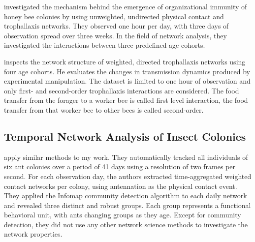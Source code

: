 
\textcite{scholl2011olfactory} investigated the mechanism behind the emergence of organizational immunity of honey bee colonies by using unweighted, undirected physical contact and trophallaxis networks.
They observed one hour per day, with three days of observation spread over three weeks.
In the field of network analysis, they investigated the interactions between three predefined age cohorts.


\textcite{naug2008structure} inspects the network structure of weighted, directed trophallaxis networks using four age cohorts.
He evaluates the changes in transmission dynamics produced by experimental manipulation.
The dataset is limited to one hour of observation and only first- and second-order trophallaxis interactions are considered. The food transfer from the forager to a worker bee is called first level interaction, the food transfer from that worker bee to other bees is called second-order.

\subsection{Temporal Network Analysis of Insect Colonies}

\textcite{mersch2013tracking} apply similar methods to my work.
They automatically tracked all individuals of six ant colonies over a period of 41 days using a resolution of two frames per second.
For each observation day, the authors extracted time-aggregated weighted contact networks per colony, using antennation as the physical contact event.
They applied the Infomap community detection algorithm to each daily network and revealed three distinct and robust groups.
Each group represents a functional behavioral unit, with ants changing groups as they age.
Except for community detection, they did not use any other network science methods to investigate the network properties.


